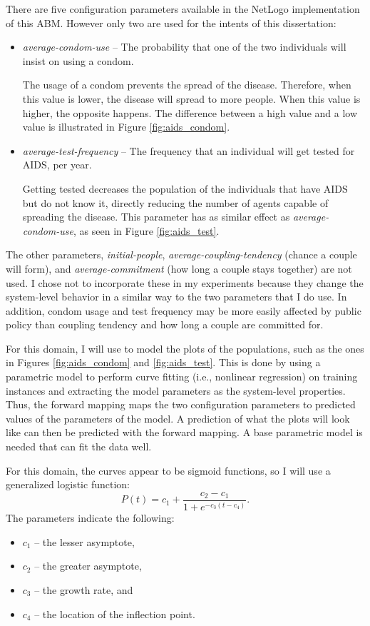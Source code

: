 There are five configuration parameters available in the NetLogo implementation of this ABM.
However only two are used for the intents of this dissertation:
\begin{itemize}
  \item \textit{average-condom-use} -- The probability that one of the two individuals will insist on using a condom.

The usage of a condom prevents the spread of the disease.
Therefore, when this value is lower, the disease will spread to more people.
When this value is higher, the opposite happens.
The difference between a high value and a low value is illustrated in Figure \ref{fig:aids_condom}.

  \item \textit{average-test-frequency} -- The frequency that an individual will get tested for AIDS, per year.

Getting tested decreases the population of the individuals that have AIDS but do not know it, directly reducing the number of agents capable of spreading the disease.
This parameter has as similar effect as \textit{average-condom-use}, as seen in Figure \ref{fig:aids_test}.
\end{itemize}
The other parameters, \textit{initial-people}, \textit{average-coupling-tendency} (chance a couple will form), and \textit{average-commitment} (how long a couple stays together) are not used.
I chose not to incorporate these in my experiments because they change the system-level behavior in a similar way to the two parameters that I do use.
In addition, condom usage and test frequency may be more easily affected by public policy than coupling tendency and how long a couple are committed for.

For this domain, I will use \fw to model the plots of the populations, such as the ones in Figures \ref{fig:aids_condom} and \ref{fig:aids_test}.
This is done by using a parametric model to perform curve fitting (i.e., nonlinear regression) on training instances and extracting the model parameters as the system-level properties.
Thus, the forward mapping maps the two configuration parameters to predicted values of the parameters of the model.
A prediction of what the plots will look like can then be predicted with the forward mapping.
A base parametric model is needed that can fit the data well.

For this domain, the curves appear to be sigmoid functions, so I will use a generalized logistic function:
\[P(t) = c_1 + \displaystyle\frac{c_2 - c_1}{1 + e^{-c_3 (t - c_4)}}.\]
The parameters indicate the following:
\begin{itemize}
 \item $c_1$ -- the lesser asymptote,
 \item $c_2$ -- the greater asymptote,
 \item $c_3$ -- the growth rate, and
 \item $c_4$ -- the location of the inflection point.
\end{itemize}

